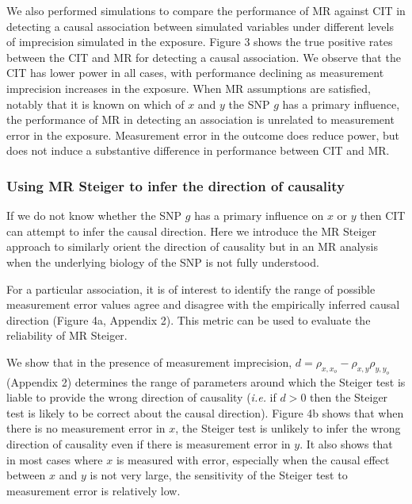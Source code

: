 \documentclass[]{article}
\begin{document}
We also performed simulations to compare the performance of MR against
CIT in detecting a causal association between simulated variables under
different levels of imprecision simulated in the exposure. Figure 3
shows the true positive rates between the CIT and MR for detecting a
causal association. We observe that the CIT has lower power in all
cases, with performance declining as measurement imprecision increases
in the exposure. When MR assumptions are satisfied, notably that it is
known on which of \(x\) and \(y\) the SNP \(g\) has a primary influence,
the performance of MR in detecting an association is unrelated to
measurement error in the exposure. Measurement error in the outcome does
reduce power, but does not induce a substantive difference in
performance between CIT and MR.

\subsubsection{Using MR Steiger to infer the direction of
causality}\label{using-mr-steiger-to-infer-the-direction-of-causality}

If we do not know whether the SNP \(g\) has a primary influence on \(x\)
or \(y\) then CIT can attempt to infer the causal direction. Here we
introduce the MR Steiger approach to similarly orient the direction of
causality but in an MR analysis when the underlying biology of the SNP
is not fully understood.

For a particular association, it is of interest to identify the range of
possible measurement error values agree and disagree with the
empirically inferred causal direction (Figure 4a, Appendix 2). This
metric can be used to evaluate the reliability of MR Steiger.

We show that in the presence of measurement imprecision,
\(d = \rho_{x, x_o} - \rho_{x,y}\rho_{y,y_o}\) (Appendix 2) determines
the range of parameters around which the Steiger test is liable to
provide the wrong direction of causality (\emph{i.e.} if \(d>0\) then
the Steiger test is likely to be correct about the causal direction).
Figure 4b shows that when there is no measurement error in \(x\), the
Steiger test is unlikely to infer the wrong direction of causality even
if there is measurement error in \(y\). It also shows that in most cases
where \(x\) is measured with error, especially when the causal effect
between \(x\) and \(y\) is not very large, the sensitivity of the
Steiger test to measurement error is relatively low.
\end{document}
